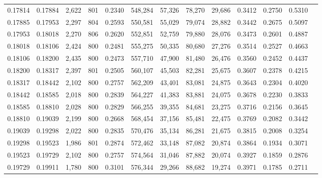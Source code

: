\begin{tabular}{rrrrrrrrrrrrr}
0.17814 & 0.17884 &  2,622 & 801 &                                     0.2340 & 548,284 &  57,326 &  78,270 &  29,686 & 0.3412 & 0.2750 & 0.5310 \\
0.17885 & 0.17953 &  2,297 & 804 &                                     0.2593 & 550,581 &  55,029 &  79,074 &  28,882 & 0.3442 & 0.2675 & 0.5097 \\
0.17953 & 0.18018 &  2,270 & 806 &                                     0.2620 & 552,851 &  52,759 &  79,880 &  28,076 & 0.3473 & 0.2601 & 0.4887 \\
0.18018 & 0.18106 &  2,424 & 800 &                                     0.2481 & 555,275 &  50,335 &  80,680 &  27,276 & 0.3514 & 0.2527 & 0.4663 \\
0.18106 & 0.18200 &  2,435 & 800 &                                     0.2473 & 557,710 &  47,900 &  81,480 &  26,476 & 0.3560 & 0.2452 & 0.4437 \\
0.18200 & 0.18317 &  2,397 & 801 &                                     0.2505 & 560,107 &  45,503 &  82,281 &  25,675 & 0.3607 & 0.2378 & 0.4215 \\
0.18317 & 0.18442 &  2,102 & 800 &                                     0.2757 & 562,209 &  43,401 &  83,081 &  24,875 & 0.3643 & 0.2304 & 0.4020 \\
0.18442 & 0.18585 &  2,018 & 800 &                                     0.2839 & 564,227 &  41,383 &  83,881 &  24,075 & 0.3678 & 0.2230 & 0.3833 \\
0.18585 & 0.18810 &  2,028 & 800 &                                     0.2829 & 566,255 &  39,355 &  84,681 &  23,275 & 0.3716 & 0.2156 & 0.3645 \\
0.18810 & 0.19039 &  2,199 & 800 &                                     0.2668 & 568,454 &  37,156 &  85,481 &  22,475 & 0.3769 & 0.2082 & 0.3442 \\
0.19039 & 0.19298 &  2,022 & 800 &                                     0.2835 & 570,476 &  35,134 &  86,281 &  21,675 & 0.3815 & 0.2008 & 0.3254 \\
0.19298 & 0.19523 &  1,986 & 801 &                                     0.2874 & 572,462 &  33,148 &  87,082 &  20,874 & 0.3864 & 0.1934 & 0.3071 \\
0.19523 & 0.19729 &  2,102 & 800 &                                     0.2757 & 574,564 &  31,046 &  87,882 &  20,074 & 0.3927 & 0.1859 & 0.2876 \\
0.19729 & 0.19911 &  1,780 & 800 &                                     0.3101 & 576,344 &  29,266 &  88,682 &  19,274 & 0.3971 & 0.1785 & 0.2711 \\

\end{tabular}
